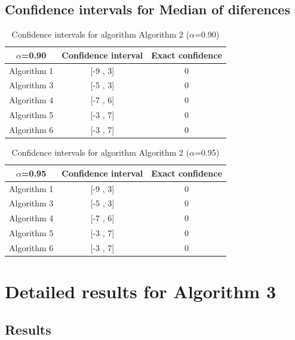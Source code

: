 \documentclass[a4paper,10pt]{article}
\begin{document}
\subsection{Confidence intervals for Median of diferences}

\begin{table}[!htp]
\centering\small
\begin{tabular}{
|c|c|c|}
\hline
 $\alpha$=0.90 & Confidence interval & Exact confidence \\ \hline 
Algorithm 1 & [-9 , 3] & 0\\ \hline 
Algorithm 3 & [-5 , 3] & 0\\ \hline 
Algorithm 4 & [-7 , 6] & 0\\ \hline 
Algorithm 5 & [-3 , 7] & 0\\ \hline 
Algorithm 6 & [-3 , 7] & 0\\ \hline 

\end{tabular}
\caption{Confidence intervals for algorithm Algorithm 2 ($\alpha$=0.90)}
\end{table}
\begin{table}[!htp]
\centering\small
\begin{tabular}{
|c|c|c|}
\hline
 $\alpha$=0.95 & Confidence interval & Exact confidence \\ \hline 
Algorithm 1 & [-9 , 3] & 0\\ \hline 
Algorithm 3 & [-5 , 3] & 0\\ \hline 
Algorithm 4 & [-7 , 6] & 0\\ \hline 
Algorithm 5 & [-3 , 7] & 0\\ \hline 
Algorithm 6 & [-3 , 7] & 0\\ \hline 

\end{tabular}
\caption{Confidence intervals for algorithm Algorithm 2 ($\alpha$=0.95)}
\end{table}

 \clearpage 


\section{Detailed results for Algorithm 3}


\subsection{Results}
\end{document}
